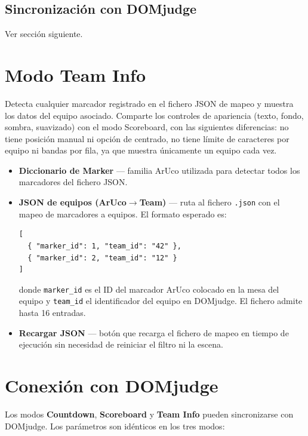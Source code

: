 \subsection*{Sincronización con DOMjudge}

Ver sección siguiente.

\section*{Modo Team Info}

Detecta cualquier marcador registrado en el fichero JSON de mapeo y muestra los datos del equipo asociado. Comparte los controles de apariencia (texto, fondo, sombra, suavizado) con el modo Scoreboard, con las siguientes diferencias: no tiene posición manual ni opción de centrado, no tiene límite de caracteres por equipo ni bandas por fila, ya que muestra únicamente un equipo cada vez.

\begin{itemize}
  \item \textbf{Diccionario de Marker} — familia ArUco utilizada para detectar todos los marcadores del fichero JSON.
  \item \textbf{JSON de equipos (ArUco$\rightarrow$Team)} — ruta al fichero \texttt{.json} con el mapeo de marcadores a equipos. El formato esperado es:
\begin{verbatim}
[
  { "marker_id": 1, "team_id": "42" },
  { "marker_id": 2, "team_id": "12" }
]
\end{verbatim}
  donde \texttt{marker\_id} es el ID del marcador ArUco colocado en la mesa del equipo y \texttt{team\_id} el identificador del equipo en DOMjudge. El fichero admite hasta 16 entradas.
  \item \textbf{Recargar JSON} — botón que recarga el fichero de mapeo en tiempo de ejecución sin necesidad de reiniciar el filtro ni la escena.
\end{itemize}

\section*{Conexión con DOMjudge}

Los modos \textbf{Countdown}, \textbf{Scoreboard} y \textbf{Team Info} pueden sincronizarse con DOMjudge. Los parámetros son idénticos en los tres modos:

